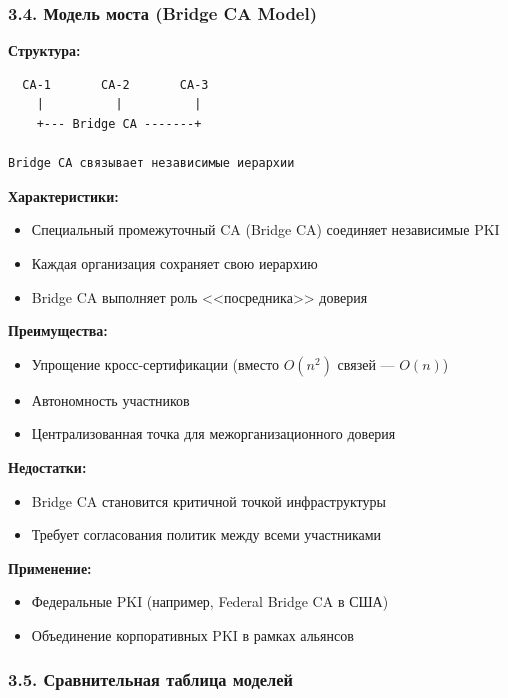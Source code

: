 \subsubsection*{3.4. Модель моста (Bridge CA Model)}

\textbf{Структура:}
\begin{verbatim}
  CA-1       CA-2       CA-3
    |          |          |
    +--- Bridge CA -------+

Bridge CA связывает независимые иерархии
\end{verbatim}

\textbf{Характеристики:}
\begin{itemize}
    \item Специальный промежуточный CA (Bridge CA) соединяет независимые PKI
    \item Каждая организация сохраняет свою иерархию
    \item Bridge CA выполняет роль <<посредника>> доверия
\end{itemize}

\textbf{Преимущества:}
\begin{itemize}
    \item Упрощение кросс-сертификации (вместо $O(n^2)$ связей — $O(n)$)
    \item Автономность участников
    \item Централизованная точка для межорганизационного доверия
\end{itemize}

\textbf{Недостатки:}
\begin{itemize}
    \item Bridge CA становится критичной точкой инфраструктуры
    \item Требует согласования политик между всеми участниками
\end{itemize}

\textbf{Применение:}
\begin{itemize}
    \item Федеральные PKI (например, Federal Bridge CA в США)
    \item Объединение корпоративных PKI в рамках альянсов
\end{itemize}

\subsubsection*{3.5. Сравнительная таблица моделей}

